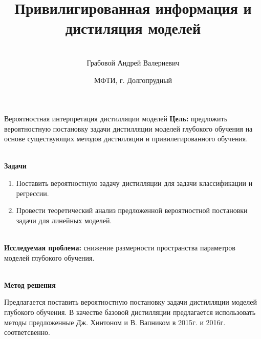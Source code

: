 \documentclass[10pt,pdf,hyperref={unicode}]{beamer}
\title[\hbox to 56mm{истилляция и привилигированная информация \hfill\insertframenumber\,/\,\inserttotalframenumber}]
{Привилигированная информация и дистиляция моделей}
\author[А.\,В.~Грабовой]{\large \\Грабовой Андрей Валериевич}
\institute{\large
Московский физико-технический институт}
\date{\footnotesize{МФТИ, г. Долгопрудный}}
\begin{document}
\begin{frame}
\titlepage
\end{frame}

\begin{frame}{Вероятностная интерпретация дистилляции моделей}
\justifying
\textbf{Цель:} предложить вероятностную постановку задачи дистилляции моделей глубокого обучения на основе существующих методов дистилляции и привилегированного обучения.



~\\
\textbf{Задачи}

\begin{enumerate}
\justifying
	\item Поставить вероятностную задачу дистилляции для задачи классификации и регрессии.
	\item Провести теоретический анализ предложенной вероятностной постановки задачи для линейных моделей.
\end{enumerate}

~\\
\textbf{Исследуемая проблема:} снижение размерности пространства параметров моделей глубокого обучения.

~\\
\textbf{Метод решения}

	Предлагается поставить вероятностную постановку задачи дистилляции моделей глубокого обучения. В качестве базовой дистилляции предлагается использовать методы предложенные Дж. Хинтоном и В. Вапником в 2015г. и 2016г. соответсвенно.
	
\end{frame}
\end{document}
